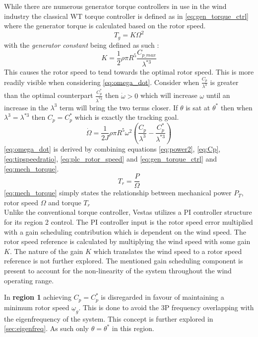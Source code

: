 While there are numerous generator torque controllers in use in the wind industry the classical WT torque controller is defined as in \cref{eq:gen_torque_ctrl} where the generator torque is calculated based on the rotor speed.
\begin{equation}\label{eq:gen_torque_ctrl}
	T_g = K \Omega^2
\end{equation}
with the \textit{generator constant} being defined as such \cite{Pao2009}:
\begin{equation}\label{eq:gen_torque_const}
	K = \dfrac{1}{2} \rho \pi R^5 \dfrac{C_{p\_max}}{\lambda^{*3}}
\end{equation}
This causes the rotor speed to tend towards the optimal rotor speed. This is more readily visible when considering \cref{eq:omega_dot}. Consider when $ \frac{C_p}{\lambda^3} $ is greater than the optimal counterpart $ \frac{C_p^*}{\lambda^{*3}} $ then $ \dot{\omega} > 0 $ which will increase $ \omega $ until an increase in the $ \lambda^3 $ term will bring the two terms closer. If $ \theta $ is sat at $ \theta^* $ then when $ \lambda^3 = \lambda^{*3} $ then $ C_p = C_p^* $ which is exactly the tracking goal.
\begin{equation}\label{eq:omega_dot}
	\dot{\Omega} = \dfrac{1}{2 J} \rho \pi R^5 \omega^2 \left( \dfrac{C_p}{\lambda^3} - \dfrac{C_p^*}{\lambda^{*3}} \right)
\end{equation}
\cref{eq:omega_dot} is derived by combining equations \cref{eq:power2}, \cref{eq:Cp}, \cref{eq:tipspeedratio}, \cref{eq:plc_rotor_speed} and \cref{eq:gen_torque_ctrl} and \cref{eq:mech_torque}.
\begin{equation}\label{eq:mech_torque}
	T_r = \dfrac{P}{\Omega}
\end{equation}
\cref{eq:mech_torque} simply states the relationship between mechanical power $ P_T $, rotor speed $ \Omega $ and torque $ T_r $\\
\smallskip
Unlike the conventional torque controller, Vestas utilizes a PI controller structure for its region 2 control. The PI controller input is the rotor speed error multiplied with a gain scheduling contribution which is dependent on the wind speed. The rotor speed reference is calculated by multiplying the wind speed with some gain $ K $. The nature of the gain $ K $ which translates the wind speed to a rotor speed reference is not further explored. The mentioned gain scheduling component is present to account for the non-linearity of the system throughout the wind operating range.

In \textbf{region 1} achieving $ C_p = C_p^* $ is disregarded in favour of maintaining a minimum rotor speed $ \underline{\omega}_g $. This is done to avoid the 3P frequency overlapping with the eigenfrequency of the system. This concept is further explored in \cref{sec:eigenfreq}. As such only $ \theta = \theta^* $ in this region.

